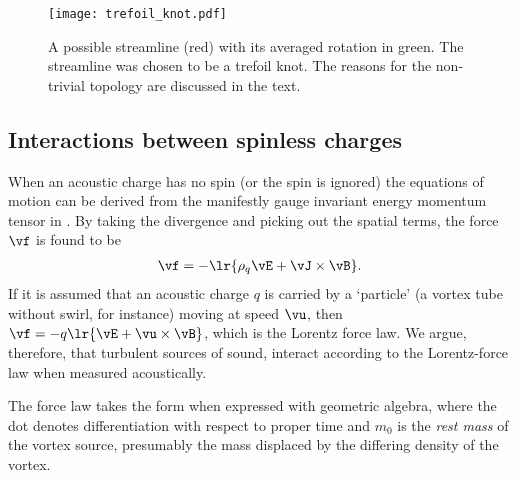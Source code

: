 

\begin{figure}[h]
 \centering
 \texttt{[image: trefoil\_knot.pdf]}
 \caption{
   A possible streamline (red) with its averaged rotation in green.
   The streamline was chosen to be a trefoil knot. The reasons for the non-trivial topology are discussed in the text.
   }
   \label{fig:particle}
\end{figure}

\subsection{Interactions between spinless charges}\label{sec:spinless}
When an acoustic charge has no spin (or the spin is ignored)
the equations of motion can be derived from the manifestly gauge invariant energy momentum tensor in  .
By taking the  divergence and picking out the spatial terms,
the force $\vf$ is found to be \cite{Doran2003}
\begin{align}
  \vf = - \lr{\rho_q\vE + \vJ \times \vB}.
\end{align}
If it is assumed that an acoustic charge $q$ is carried by a `particle' (a vortex tube without swirl, for instance)
moving at speed $\vu$, then
$\vf = - q\lr{\vE + \vu \times \vB}$, which is the Lorentz force law.
We argue, therefore, that turbulent sources of sound, interact according to the Lorentz-force law when measured acoustically.

The force law takes the form
when expressed with geometric algebra, where the dot denotes differentiation 
with respect to proper time and $m_0$ is the {\em rest mass} of the vortex source,
presumably the mass  displaced by the differing density of the vortex.

